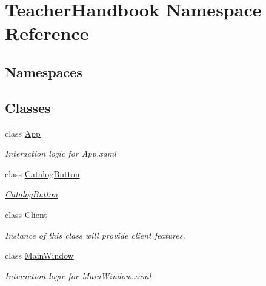 \hypertarget{namespace_teacher_handbook}{}\section{Teacher\+Handbook Namespace Reference}
\label{namespace_teacher_handbook}
\subsection*{Namespaces}
\begin{DoxyCompactItemize}
\end{DoxyCompactItemize}
\subsection*{Classes}
\begin{DoxyCompactItemize}
\item 
class \mbox{\hyperlink{class_teacher_handbook_1_1_app}{App}}
\begin{DoxyCompactList}\small\item\em Interaction logic for App.\+xaml \end{DoxyCompactList}\item 
class \mbox{\hyperlink{class_teacher_handbook_1_1_catalog_button}{Catalog\+Button}}
\begin{DoxyCompactList}\small\item\em \mbox{\hyperlink{class_teacher_handbook_1_1_catalog_button}{Catalog\+Button}} \end{DoxyCompactList}\item 
class \mbox{\hyperlink{class_teacher_handbook_1_1_client}{Client}}
\begin{DoxyCompactList}\small\item\em Instance of this class will provide client features. \end{DoxyCompactList}\item 
class \mbox{\hyperlink{class_teacher_handbook_1_1_main_window}{Main\+Window}}
\begin{DoxyCompactList}\small\item\em Interaction logic for Main\+Window.\+xaml \end{DoxyCompactList}\end{DoxyCompactItemize}
